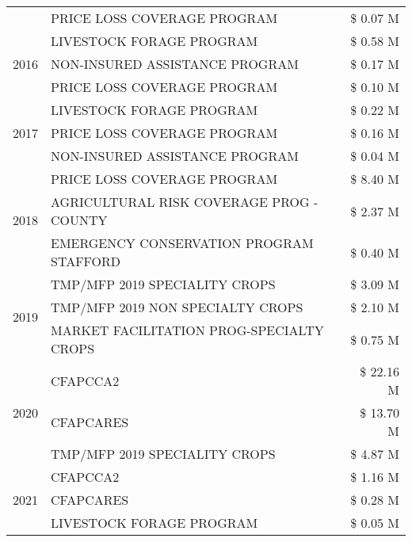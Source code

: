\begin{tabular}{llr}
 & PRICE LOSS COVERAGE PROGRAM & \$ 0.07 M \\
\cline{1-3}
\multirow[t]{3}{*}{2016} & LIVESTOCK FORAGE PROGRAM                      & \$ 0.58 M \\
 & NON-INSURED ASSISTANCE PROGRAM                & \$ 0.17 M \\
 & PRICE LOSS COVERAGE PROGRAM                   & \$ 0.10 M \\
\cline{1-3}
\multirow[t]{3}{*}{2017} & LIVESTOCK FORAGE PROGRAM & \$ 0.22 M \\
 & PRICE LOSS COVERAGE PROGRAM & \$ 0.16 M \\
 & NON-INSURED ASSISTANCE PROGRAM & \$ 0.04 M \\
\cline{1-3}
\multirow[t]{3}{*}{2018} & PRICE LOSS COVERAGE PROGRAM & \$ 8.40 M \\
 & AGRICULTURAL RISK COVERAGE PROG - COUNTY & \$ 2.37 M \\
 & EMERGENCY CONSERVATION PROGRAM STAFFORD & \$ 0.40 M \\
\cline{1-3}
\multirow[t]{3}{*}{2019} & TMP/MFP 2019 SPECIALITY CROPS & \$ 3.09 M \\
 & TMP/MFP 2019 NON SPECIALTY CROPS & \$ 2.10 M \\
 & MARKET FACILITATION PROG-SPECIALTY CROPS & \$ 0.75 M \\
\cline{1-3}
\multirow[t]{3}{*}{2020} & CFAPCCA2 & \$ 22.16 M \\
 & CFAPCARES & \$ 13.70 M \\
 & TMP/MFP 2019 SPECIALITY CROPS & \$ 4.87 M \\
\cline{1-3}
\multirow[t]{3}{*}{2021} & CFAPCCA2 & \$ 1.16 M \\
 & CFAPCARES & \$ 0.28 M \\
 & LIVESTOCK FORAGE PROGRAM & \$ 0.05 M \\
\cline{1-3}
\bottomrule
\end{tabular}
